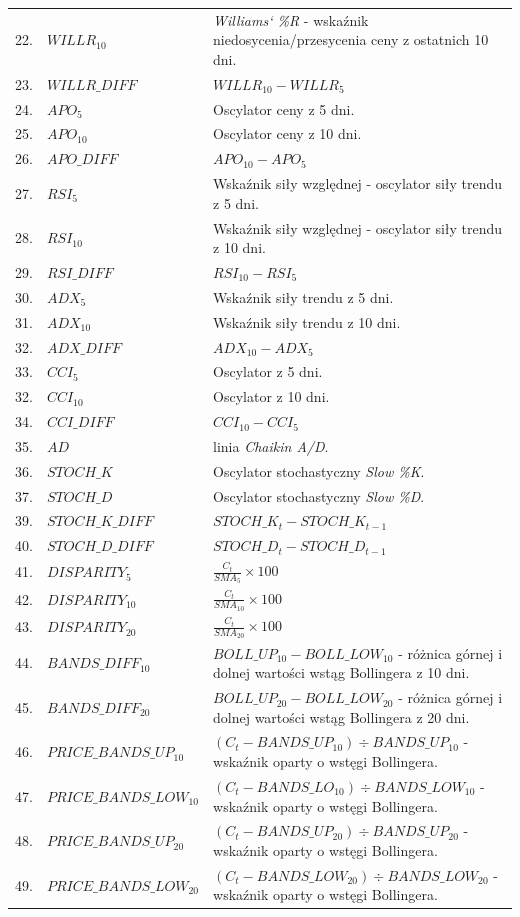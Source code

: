\documentclass[a4paper, twoside, 11pt, openright]{article}
\begin{document}
\begin{longtable}[c]{| m{0.5cm} m{5cm} m{10cm}|}
 22. & $WILLR_{10}$ & \textit{Williams` \%R} - wskaźnik niedosycenia/przesycenia ceny z ostatnich 10 dni.  \\
 23. & $WILLR\_DIFF$ & $WILLR_{10}-WILLR_{5}$ \\
  24. & $APO_{5}$ & Oscylator ceny z 5 dni. \\
 25. & $APO_{10}$ & Oscylator ceny z 10 dni.  \\
 26. & $APO\_DIFF$ & $APO_{10}-APO_{5}$ \\
  27. & $RSI_{5}$ & Wskaźnik siły względnej - oscylator siły trendu z 5 dni. \\
 28. & $RSI_{10}$ & Wskaźnik siły względnej - oscylator siły trendu z 10 dni.\\
 29. & $RSI\_DIFF$ & $RSI_{10}-RSI_{5}$ \\
  30. & $ADX_{5}$ & Wskaźnik siły trendu z 5 dni. \\
 31. & $ADX_{10}$ & Wskaźnik siły trendu z 10 dni. \\
 32. & $ADX\_DIFF$ & $ADX_{10}-ADX_{5}$ \\
 33. & $CCI_{5}$ & Oscylator z 5 dni. \\
 32. & $CCI_{10}$ & Oscylator z 10 dni. \\
 34. & $CCI\_DIFF$ & $CCI_{10}-CCI_{5}$ \\
 35. & $AD$ & linia \textit{Chaikin A/D}.  \\
 36. & $STOCH\_K$ & Oscylator stochastyczny \textit{Slow \%K}. \\
 37. & $STOCH\_D$ & Oscylator stochastyczny \textit{Slow \%D}.\\
 39. & $STOCH\_K\_DIFF$ & $STOCH\_K_{t}-STOCH\_K_{t-1}$ \\
 40. & $STOCH\_D\_DIFF$ & $STOCH\_D_{t}-STOCH\_D_{t-1}$  \\
 41. & $DISPARITY_{5}$ &  $\frac{C_t}{SMA_5}\times 100$ \\
 42. & $DISPARITY_{10}$ & $\frac{C_t}{SMA_10}\times 100$ \\
 43. & $DISPARITY_{20}$ & $\frac{C_t}{SMA_20}\times 100$ \\
 44. & $BANDS\_DIFF_{10}$ & $BOLL\_UP_{10} - BOLL\_LOW_{10}$ - różnica górnej i dolnej wartości wstąg Bollingera z 10 dni.  \\
 45. & $BANDS\_DIFF_{20}$ & $BOLL\_UP_{20} - BOLL\_LOW_{20}$ - różnica górnej i dolnej wartości wstąg Bollingera z 20 dni.  \\
46. & $PRICE\_BANDS\_UP_{10}$ & $(C_t-BANDS\_UP_{10})\div BANDS\_UP_{10}$ - wskaźnik oparty o wstęgi Bollingera.  \\
 47. & $PRICE\_BANDS\_LOW_{10}$ & $(C_t-BANDS\_LO_{10})\div BANDS\_LOW_{10}$ - wskaźnik oparty o wstęgi Bollingera.\\
 48. & $PRICE\_BANDS\_UP_{20}$ & $(C_t-BANDS\_UP_{20})\div BANDS\_UP_{20}$ - wskaźnik oparty o wstęgi Bollingera.\\
 49. & $PRICE\_BANDS\_LOW_{20}$ & $(C_t-BANDS\_LOW_{20})\div BANDS\_LOW_{20}$ - wskaźnik oparty o wstęgi Bollingera.\\
     
\end{longtable}
\end{document}
